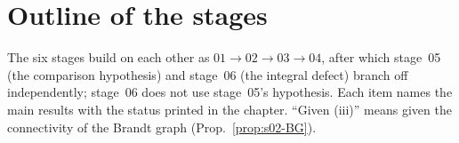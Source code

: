 \section{Outline of the stages}\label{ss:s00-outline}
The six stages build on each other as $01\to02\to03\to04$, after which stage~05 (the comparison hypothesis) and stage~06 (the
integral defect) branch off independently; stage~06 does not use stage~05's hypothesis. Each item names the main results with
the status printed in the chapter. ``Given (iii)'' means given the connectivity of the Brandt graph (Prop.~\ref{prop:s02-BG}).


